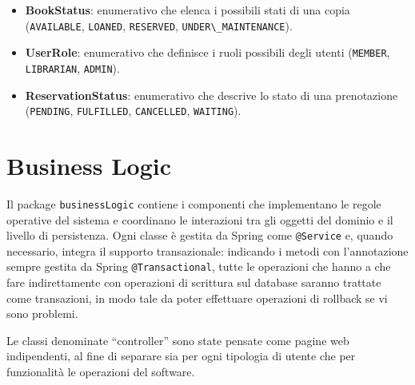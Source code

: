 \documentclass[
  italian,
  paper=a4,
  ,captions=tableheading
]{scrbook}
\newcommand{\passthrough}[1]{#1}
\begin{document}
\begin{itemize}
\begin{itemize}
    Ad esempio, \passthrough{\lstinline!LoanedState!} implementa
    \passthrough{\lstinline!returnCopy()!} per cambiare lo stato della
    \passthrough{\lstinline!BookCopy!} in
    \passthrough{\lstinline!AvailableState!} e notificare gli
    osservatori, mentre la sua implementazione di
    \passthrough{\lstinline!loan()!} si limita a stampare un messaggio
    di errore, poiché l'azione non è valida in quello stato.
  \end{itemize}
\item
  \textbf{BookStatus}: enumerativo che elenca i possibili stati di una
  copia (\passthrough{\lstinline!AVAILABLE!},
  \passthrough{\lstinline!LOANED!}, \passthrough{\lstinline!RESERVED!},
  \passthrough{\lstinline!UNDER\_MAINTENANCE!}).
\item
  \textbf{UserRole}: enumerativo che definisce i ruoli possibili degli
  utenti (\passthrough{\lstinline!MEMBER!},
  \passthrough{\lstinline!LIBRARIAN!}, \passthrough{\lstinline!ADMIN!}).
\item
  \textbf{ReservationStatus}: enumerativo che descrive lo stato di una
  prenotazione (\passthrough{\lstinline!PENDING!},
  \passthrough{\lstinline!FULFILLED!},
  \passthrough{\lstinline!CANCELLED!},
  \passthrough{\lstinline!WAITING!}).
\end{itemize}

\section{Business Logic}\label{business-logic}

Il package \passthrough{\lstinline!businessLogic!} contiene i componenti
che implementano le regole operative del sistema e coordinano le
interazioni tra gli oggetti del dominio e il livello di persistenza.
Ogni classe è gestita da Spring come \passthrough{\lstinline!@Service!}
e, quando necessario, integra il supporto transazionale: indicando i
metodi con l'annotazione sempre gestita da Spring
\passthrough{\lstinline!@Transactional!}, tutte le operazioni che hanno
a che fare indirettamente con operazioni di scrittura sul database
saranno trattate come transazioni, in modo tale da poter effettuare
operazioni di rollback se vi sono problemi.

Le classi denominate ``controller'' sono state pensate come pagine web
indipendenti, al fine di separare sia per ogni tipologia di utente che
per funzionalità le operazioni del software.
\end{document}
